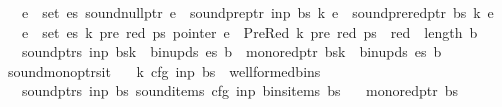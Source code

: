 \begin{isabellebody}
\ \ \ {\isachardoublequoteopen}{\isasymforall}e\ {\isasymin}\ set\ es{\isachardot}{\kern0pt}\ sound{\isacharunderscore}{\kern0pt}null{\isacharunderscore}{\kern0pt}ptr\ e\ {\isasymand}\ sound{\isacharunderscore}{\kern0pt}pre{\isacharunderscore}{\kern0pt}ptr\ inp\ bs\ k\ e\ {\isasymand}\ sound{\isacharunderscore}{\kern0pt}prered{\isacharunderscore}{\kern0pt}ptr\ bs\ k\ e{\isachardoublequoteclose}\isanewline
\ \ \ {\isachardoublequoteopen}{\isasymforall}e\ {\isasymin}\ set\ es{\isachardot}{\kern0pt}\ {\isasymforall}k{\isacharprime}{\kern0pt}\ pre\ red\ ps{\isachardot}{\kern0pt}\ pointer\ e\ {\isacharequal}{\kern0pt}\ PreRed\ {\isacharparenleft}{\kern0pt}k{\isacharprime}{\kern0pt}{\isacharcomma}{\kern0pt}\ pre{\isacharcomma}{\kern0pt}\ red{\isacharparenright}{\kern0pt}\ ps\ {\isasymlongrightarrow}\ red\ {\isacharless}{\kern0pt}\ length\ b{\isachardoublequoteclose}\isanewline
\ \ \ {\isachardoublequoteopen}sound{\isacharunderscore}{\kern0pt}ptrs\ inp\ {\isacharparenleft}{\kern0pt}bs{\isacharbrackleft}{\kern0pt}k\ {\isacharcolon}{\kern0pt}{\isacharequal}{\kern0pt}\ bin{\isacharunderscore}{\kern0pt}upds\ es\ b{\isacharbrackright}{\kern0pt}{\isacharparenright}{\kern0pt}\ {\isasymand}\ mono{\isacharunderscore}{\kern0pt}red{\isacharunderscore}{\kern0pt}ptr\ {\isacharparenleft}{\kern0pt}bs{\isacharbrackleft}{\kern0pt}k\ {\isacharcolon}{\kern0pt}{\isacharequal}{\kern0pt}\ bin{\isacharunderscore}{\kern0pt}upds\ es\ b{\isacharbrackright}{\kern0pt}{\isacharparenright}{\kern0pt}{\isachardoublequoteclose}%
\isadelimproof
%
\endisadelimproof
%
\isatagproof
%
\endisatagproof
{\isafoldproof}%
%
\isadelimproof
\isanewline
%
\endisadelimproof
{}\isamarkupfalse%
\ sound{\isacharunderscore}{\kern0pt}mono{\isacharunderscore}{\kern0pt}ptrs{\isacharunderscore}{\kern0pt}{\isasympi}{\isacharunderscore}{\kern0pt}it{\isacharprime}{\kern0pt}{\isacharcolon}{\kern0pt}\isanewline
\ \ \ {\isachardoublequoteopen}{\isacharparenleft}{\kern0pt}k{\isacharcomma}{\kern0pt}\ cfg{\isacharcomma}{\kern0pt}\ inp{\isacharcomma}{\kern0pt}\ bs{\isacharparenright}{\kern0pt}\ {\isasymin}\ wellformed{\isacharunderscore}{\kern0pt}bins{\isachardoublequoteclose}\isanewline
\ \ \ {\isachardoublequoteopen}sound{\isacharunderscore}{\kern0pt}ptrs\ inp\ bs{\isachardoublequoteclose}\ {\isachardoublequoteopen}sound{\isacharunderscore}{\kern0pt}items\ cfg\ inp\ {\isacharparenleft}{\kern0pt}bins{\isacharunderscore}{\kern0pt}items\ bs{\isacharparenright}{\kern0pt}{\isachardoublequoteclose}\isanewline
\ \ \ {\isachardoublequoteopen}mono{\isacharunderscore}{\kern0pt}red{\isacharunderscore}{\kern0pt}ptr\ bs{\isachardoublequoteclose}\isanewline

\end{isabellebody}
